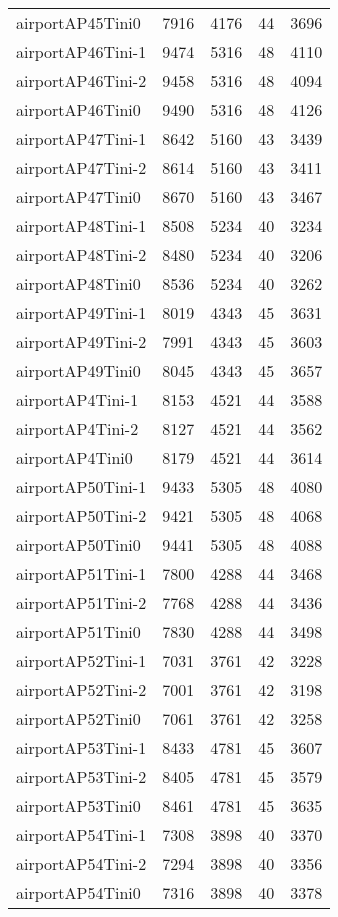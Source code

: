 \begin{longtable}{lrrrr}
airportAP45Tini0 & 7916 & 4176 & 44 & 3696 \\
airportAP46Tini-1 & 9474 & 5316 & 48 & 4110 \\
airportAP46Tini-2 & 9458 & 5316 & 48 & 4094 \\
airportAP46Tini0 & 9490 & 5316 & 48 & 4126 \\
airportAP47Tini-1 & 8642 & 5160 & 43 & 3439 \\
airportAP47Tini-2 & 8614 & 5160 & 43 & 3411 \\
airportAP47Tini0 & 8670 & 5160 & 43 & 3467 \\
airportAP48Tini-1 & 8508 & 5234 & 40 & 3234 \\
airportAP48Tini-2 & 8480 & 5234 & 40 & 3206 \\
airportAP48Tini0 & 8536 & 5234 & 40 & 3262 \\
airportAP49Tini-1 & 8019 & 4343 & 45 & 3631 \\
airportAP49Tini-2 & 7991 & 4343 & 45 & 3603 \\
airportAP49Tini0 & 8045 & 4343 & 45 & 3657 \\
airportAP4Tini-1 & 8153 & 4521 & 44 & 3588 \\
airportAP4Tini-2 & 8127 & 4521 & 44 & 3562 \\
airportAP4Tini0 & 8179 & 4521 & 44 & 3614 \\
airportAP50Tini-1 & 9433 & 5305 & 48 & 4080 \\
airportAP50Tini-2 & 9421 & 5305 & 48 & 4068 \\
airportAP50Tini0 & 9441 & 5305 & 48 & 4088 \\
airportAP51Tini-1 & 7800 & 4288 & 44 & 3468 \\
airportAP51Tini-2 & 7768 & 4288 & 44 & 3436 \\
airportAP51Tini0 & 7830 & 4288 & 44 & 3498 \\
airportAP52Tini-1 & 7031 & 3761 & 42 & 3228 \\
airportAP52Tini-2 & 7001 & 3761 & 42 & 3198 \\
airportAP52Tini0 & 7061 & 3761 & 42 & 3258 \\
airportAP53Tini-1 & 8433 & 4781 & 45 & 3607 \\
airportAP53Tini-2 & 8405 & 4781 & 45 & 3579 \\
airportAP53Tini0 & 8461 & 4781 & 45 & 3635 \\
airportAP54Tini-1 & 7308 & 3898 & 40 & 3370 \\
airportAP54Tini-2 & 7294 & 3898 & 40 & 3356 \\
airportAP54Tini0 & 7316 & 3898 & 40 & 3378 \\

\end{longtable}

